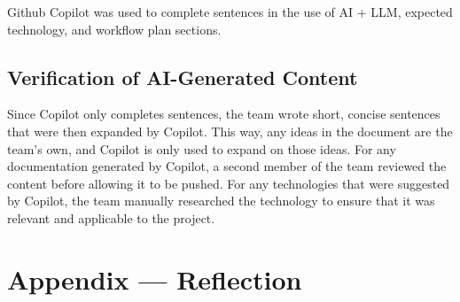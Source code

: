 \documentclass{article}
\begin{document}
Github Copilot was used to complete sentences in the use of AI + LLM, expected technology, and workflow plan sections.

\subsection{Verification of AI-Generated Content}

Since Copilot only completes sentences, the team wrote short, concise sentences that were then expanded by Copilot. This way, any ideas in the document are the team's own, and Copilot is only used to expand on those ideas.
For any documentation generated by Copilot, a second member of the team reviewed the content before allowing it to be pushed. For any technologies that were suggested by Copilot, the team manually researched the technology to ensure that it was relevant and applicable to the project.

\newpage{}

\section*{Appendix --- Reflection}


\end{document}
